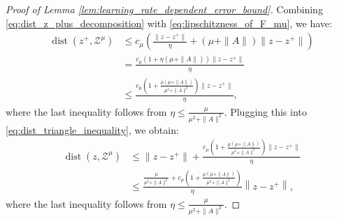 \documentclass{article}
\DeclareMathOperator{\dist}{dist}
\newcommand{\Z}{\mathcal{Z}}
\theoremstyle{plain}
\begin{document}
\begin{proof}[Proof of Lemma \ref{lem:learning_rate_dependent_error_bound}]
    Combining \eqref{eq:dist_z_plus_decomposition} with \eqref{eq:lipschitzness_of_F_mu}, we have:
    \begin{align*}
        \dist(z^+, \Z^{\mu})
        & \leq c_{\mu}\left(\frac{\|z - z^+\|}{\eta} + (\mu + \|A\|)\|z - z^+\|\right)                    \\
        & = \frac{c_{\mu}(1 + \eta (\mu + \|A\|))\|z - z^+\|}{\eta}                                       \\
        & \leq \frac{c_{\mu}\left(1 + \frac{\mu (\mu + \|A\|)}{\mu^2 + \|A\|^2}\right)\|z - z^+\|}{\eta},
    \end{align*}
    where the last inequality follows from $\eta \leq \frac{\mu}{\mu^2 + \|A\|^2}$.
    Plugging this into \eqref{eq:dist_triangle_inequality}, we obtain:
    \begin{align}
        \dist(z, \Z^{\mu})
        & \leq \|z - z^+\| + \frac{c_{\mu}\left(1 + \frac{\mu (\mu + \|A\|)}{\mu^2 + \|A\|^2}\right)\|z - z^+\|}{\eta} \nonumber                   \\
        & \leq \frac{\frac{\mu}{\mu^2 + \|A\|^2} + c_{\mu}\left(1 + \frac{\mu (\mu + \|A\|)}{\mu^2 + \|A\|^2}\right)}{\eta}\left\|z - z^+\right\|,
        \label{eq:hoffman_bound_application}
    \end{align}
    where the last inequality follows from $\eta \leq \frac{\mu}{\mu^2 + \|A\|^2}$.


\end{proof}
\end{document}
